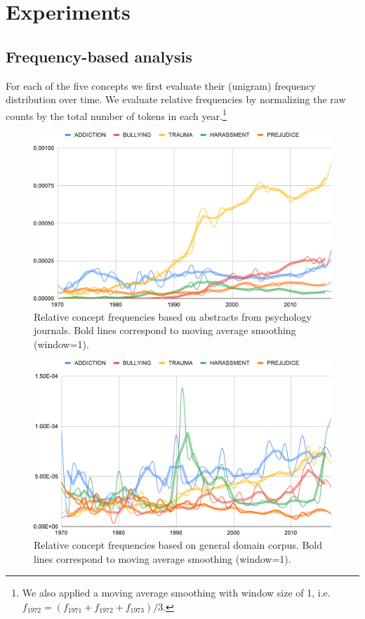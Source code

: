 \documentclass[output=paper]{langsci/langscibook}
\begin{document}
\section{Experiments}
\subsection{Frequency-based analysis}
For each of the five concepts we first evaluate their (unigram) frequency distribution over time. We evaluate relative frequencies by normalizing the raw counts by the total number of tokens in each year.\footnote{We also applied a moving average smoothing with window size of 1, i.e. $f_{1972}=(f_{1971}+f_{1972}+f_{1973})/3$.} 

\begin{figure}[p]
  \includegraphics[width=.8\textwidth]{figures/VYLOMOVA_harm-relfreq.pdf}
\caption{Relative concept frequencies based on abstracts from psychology journals. Bold lines correspond to moving average smoothing (window=1).\label{fig:journals-ngrams}}
\end{figure}

\begin{figure}[p]
  \includegraphics[width=.8\textwidth]{figures/VYLOMOVA_harm-relfreq-coca.pdf}
\caption{Relative concept frequencies based on general domain corpus. Bold lines correspond to moving average smoothing (window=1).\label{fig:coca-ngrams}}
\end{figure}
\end{document}
